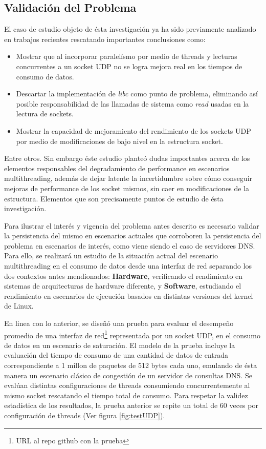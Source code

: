 \subsection{Validación del Problema}

El caso de estudio objeto de ésta investigación ya ha sido previamente analizado en trabajos recientes \cite{tesis:diegoDCC} rescatando importantes conclusiones como:
\begin{itemize}
\item Mostrar que al incorporar paralelísmo por medio de threads y lecturas concurrentes a un socket UDP no se logra mejora real en los tiempos de consumo de datos.
\item Descartar la implementación de \emph{libc} como punto de problema, eliminando así posible responsabilidad de las llamadas de sistema como \emph{read} usadas en la lectura de sockets.
\item Mostrar la capacidad de mejoramiento del rendimiento de los sockets UDP por medio de modificaciones de bajo nivel en la estructura socket.
\end{itemize}

Entre otros. Sin embargo éste estudio planteó dudas importantes acerca de los elementos responsables del degradamiento de performance en escenarios multithreading, además de dejar latente la incertidumbre sobre cómo conseguir mejoras de performance de los socket mismos, sin caer en modificaciones de la estructura. Elementos que son precisamente puntos de estudio de ésta investigación.

Para ilustrar el interés y vigencia del problema antes descrito es necesario validar la persistencia del mismo en escenarios actuales que corroboren la persistencia del problema en escenarios de interés, como viene siendo el caso de servidores DNS. Para ello, se realizará un estudio de la situación actual del escenario multithreading en el consumo de datos desde una interfaz de red separando los dos contextos antes mendionados: \textbf{Hardware}, verificando el rendimiento en sistemas de arquitecturas de hardware diferente, y \textbf{Software}, estudiando el rendimiento en escenarios de ejecución basados en distintas versiones del kernel de Linux.

En linea con lo anterior, se diseñó una prueba para evaluar el desempeño promedio de una interfaz de red\footnote{URL al repo github con la prueba} representada por un socket UDP, en el consumo de datos en un escenario de saturación. El modelo de la prueba incluye la evaluación del tiempo de consumo de una cantidad de datos de entrada correspondiente a 1 millon de paquetes de 512 bytes cada uno, emulando de ésta manera un escenario clásico de congestión de un servidor de consultas DNS. Se evalúan distintas configuraciones de threads consumiendo concurrentemente al mismo socket rescatando el tiempo total de consumo. Para respetar la validez estadística de los resultados, la prueba anterior se repite un total de 60 veces por configuración de threads (Ver figura \ref{fig:testUDP}).

